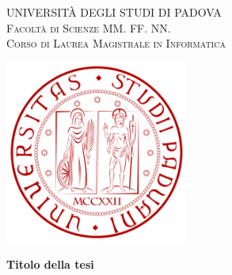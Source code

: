 
\begin{titlepage}
    \begin{center}
        {\Large UNIVERSITÀ DEGLI STUDI DI PADOVA}\\
        \vspace{0.2cm}                                                  %
        {\Large \scshape Facoltà di Scienze MM. FF. NN.}\\
        \vspace{2mm}
        {\Large \scshape Corso di Laurea Magistrale in Informatica}\\
        \vspace{2mm}                                                      %
        
        \vspace{0.3cm}
        \includegraphics[width=6cm]{figure/unipd_logo}\\
        \vspace{2cm}
        
        \vspace{2cm}
        {\LARGE \bfseries Titolo della tesi} \\
        \vspace{4cm}
    \end{center}


\end{titlepage}
